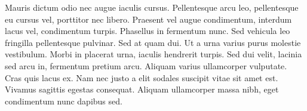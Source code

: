 Mauris dictum odio nec augue iaculis cursus. Pellentesque arcu leo, pellentesque eu cursus vel, porttitor nec libero. Praesent vel augue condimentum, interdum lacus vel, condimentum turpis. Phasellus in fermentum nunc. Sed vehicula leo fringilla pellentesque pulvinar. Sed at quam dui. Ut a urna varius purus molestie vestibulum. Morbi in placerat urna, iaculis hendrerit turpis. Sed dui velit, lacinia sed arcu in, fermentum pretium arcu. Aliquam varius ullamcorper vulputate. Cras quis lacus ex. Nam nec justo a elit sodales suscipit vitae sit amet est. Vivamus sagittis egestas consequat. Aliquam ullamcorper massa nibh, eget condimentum nunc dapibus sed.